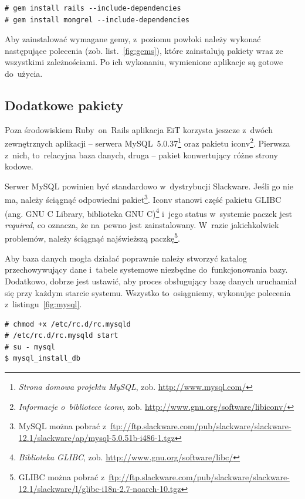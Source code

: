 \documentclass[a4paper,12pt,oneside]{report}
\begin{document}
\begin{lstlisting}[caption={Lista poleceń niezbędnych do~zainstalowania wymaganych gemów},label=fig:gems,captionpos=b]
# gem install rails --include-dependencies
# gem install mongrel --include-dependencies
\end{lstlisting}
Aby zainstalować wymagane gemy, z~poziomu powłoki należy wykonać następujące polecenia (zob. list.~\ref{fig:gems}), które zainstalują pakiety wraz ze wszystkimi zależnościami. Po ich wykonaniu, wymienione aplikacje są gotowe do~użycia.

\subsection{Dodatkowe pakiety}
\label{sub:dodatkowe}
Poza środowiskiem Ruby~on~Rails aplikacja EiT korzysta jeszcze z~dwóch zewnętrznych aplikacji -- serwera MySQL~5.0.37\footnote{\emph{Strona domowa projektu MySQL}, zob. \url{http://www.mysql.com/}} oraz pakietu iconv\footnote{\emph{Informacje o~bibliotece iconv}, zob. \url{http://www.gnu.org/software/libiconv/}}. Pierwsza z~nich, to~relacyjna baza danych, druga -- pakiet konwertujący różne strony kodowe.

Serwer MySQL powinien być standardowo w~dystrybucji Slackware. Jeśli go nie ma, należy ściągnąć odpowiedni pakiet\footnote{MySQL można pobrać z~\url{ftp://ftp.slackware.com/pub/slackware/slackware-12.1/slackware/ap/mysql-5.0.51b-i486-1.tgz}}. Iconv stanowi część pakietu GLIBC (ang. GNU C Library, biblioteka GNU C)\footnote{\emph{Biblioteka GLIBC}, zob. \url{http://www.gnu.org/software/libc/}} i~jego status w~systemie paczek jest \emph{required}, co oznacza, że na~pewno jest zainstalowany. W~razie jakichkolwiek problemów, należy ściągnąć najświeższą paczkę\footnote{GLIBC można pobrać z~\url{ftp://ftp.slackware.com/pub/slackware/slackware-12.1/slackware/l/glibc-i18n-2.7-noarch-10.tgz}}.

Aby baza danych mogła działać poprawnie należy stworzyć katalog przechowywujący dane i~tabele systemowe niezbędne do~funkcjonowania bazy. Dodatkowo, dobrze jest ustawić, aby proces obsługujący bazę danych uruchamiał się przy każdym starcie systemu. Wszystko to~osiągniemy, wykonując polecenia z~listingu~\ref{fig:mysql}.

\begin{lstlisting}[caption={Lista poleceń niezbędnych do~zainicjalizowania MySQL},label=fig:mysql,captionpos=b]
# chmod +x /etc/rc.d/rc.mysqld
# /etc/rc.d/rc.mysqld start
# su - mysql
$ mysql_install_db
\end{lstlisting}
\end{document}
